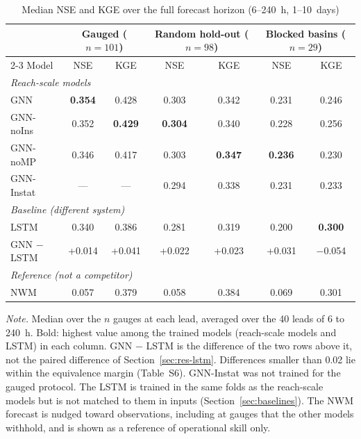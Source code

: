 \begin{table}
\centering
\caption{Median NSE and KGE over the full forecast horizon (6--240~h, 1--10~days)}
\label{tab:skill}
\footnotesize
\renewcommand{\arraystretch}{1.25}
\begin{tabular*}{\textwidth}{@{\extracolsep{\fill}}lcccccc@{}}
\toprule
 & \multicolumn{2}{c}{Gauged ($n = 101$)} & \multicolumn{2}{c}{Random hold-out ($n = 98$)} & \multicolumn{2}{c}{Blocked basins ($n = 29$)} \\
\cmidrule{2-3}\cmidrule{4-5}\cmidrule{6-7}
Model & NSE & KGE & NSE & KGE & NSE & KGE \\
\midrule
\multicolumn{7}{l}{\emph{Reach-scale models}} \\
GNN & \textbf{0.354} & 0.428 & 0.303 & 0.342 & 0.231 & 0.246 \\
GNN-noIns & 0.352 & \textbf{0.429} & \textbf{0.304} & 0.340 & 0.228 & 0.256 \\
GNN-noMP & 0.346 & 0.417 & 0.303 & \textbf{0.347} & \textbf{0.236} & 0.230 \\
GNN-Instat & --- & --- & 0.294 & 0.338 & 0.231 & 0.233 \\
\midrule
\multicolumn{7}{l}{\emph{Baseline (different system)}} \\
LSTM & 0.340 & 0.386 & 0.281 & 0.319 & 0.200 & \textbf{0.300} \\
GNN $-$ LSTM & +0.014 & +0.041 & +0.022 & +0.023 & +0.031 & $-$0.054 \\
\midrule
\multicolumn{7}{l}{\emph{Reference (not a competitor)}} \\
NWM & 0.057 & 0.379 & 0.058 & 0.384 & 0.069 & 0.301 \\
\bottomrule
\end{tabular*}
\begin{flushleft}
\footnotesize \emph{Note.} Median over the $n$ gauges at each lead, averaged over the 40 leads of 6 to 240~h. Bold: highest value among the trained models (reach-scale models and LSTM) in each column. GNN $-$ LSTM is the difference of the two rows above it, not the paired difference of Section~\ref{sec:res-lstm}. Differences smaller than 0.02 lie within the equivalence margin (Table~S6). GNN-Instat was not trained for the gauged protocol. The LSTM is trained in the same folds as the reach-scale models but is not matched to them in inputs (Section~\ref{sec:baselines}). The NWM forecast is nudged toward observations, including at gauges that the other models withhold, and is shown as a reference of operational skill only.
\end{flushleft}
\end{table}

